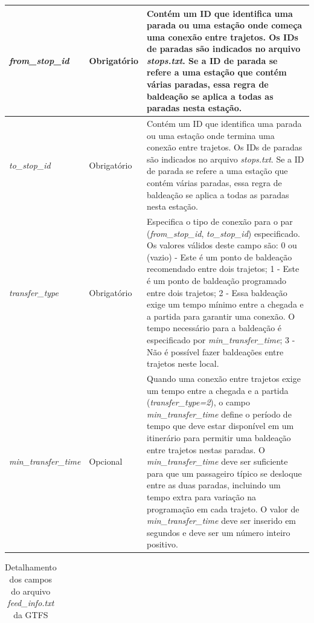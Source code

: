 \documentclass[
	12pt,				%
	oneside,			%
	a4paper,			%
	english,			%
	brazil				%
	]{abntex2ppgsi}
\begin{document}
{{\begin{apendicesenv}
\begin{longtable}[!htb]{>{\centering\arraybackslash}m{3.8cm} | >{\centering}m{2.5cm} | >{\centering\arraybackslash}m{8.5cm}}
\hline 
\textit{from\_stop\_id} & Obrigatório & Contém um ID que identifica uma parada ou uma estação onde começa uma conexão entre trajetos. Os IDs de paradas são indicados no arquivo \textit{stops.txt}. Se a ID de parada se refere a uma estação que contém várias paradas, essa regra de baldeação se aplica a todas as paradas nesta estação. \\
\hline 
\textit{to\_stop\_id} & Obrigatório & Contém um ID que identifica uma parada ou uma estação onde termina uma conexão entre trajetos. Os IDs de paradas são indicados no arquivo \textit{stops.txt}. Se a ID de parada se refere a uma estação que contém várias paradas, essa regra de baldeação se aplica a todas as paradas nesta estação. \\
\hline 
\textit{transfer\_type} & Obrigatório & Especifica o tipo de conexão para o par (\textit{from\_stop\_id}, \textit{to\_stop\_id}) especificado. Os valores válidos deste campo são: 0 ou (vazio) - Este é um ponto de baldeação recomendado entre dois trajetos; 1 - Este é um ponto de baldeação programado entre dois trajetos; 2 - Essa baldeação exige um tempo mínimo entre a chegada e a partida para garantir uma conexão. O tempo necessário para a baldeação é especificado por \textit{min\_transfer\_time}; 3 - Não é possível fazer baldeações entre trajetos neste local. \\
\hline 
\textit{min\_transfer\_time} & Opcional & Quando uma conexão entre trajetos exige um tempo entre a chegada e a partida (\textit{transfer\_type=2}), o campo \textit{min\_transfer\_time} define o período de tempo que deve estar disponível em um itinerário para permitir uma baldeação entre trajetos nestas paradas. O \textit{min\_transfer\_time} deve ser suficiente para que um passageiro típico se desloque entre as duas paradas, incluindo um tempo extra para variação na programação em cada trajeto.
O valor de \textit{min\_transfer\_time} deve ser inserido em segundos e deve ser um número inteiro positivo. \\
\hline 
\end{longtable}
\vspace{-\baselineskip}

\clearpage

\begin{longtable}[!htb]{>{\centering\arraybackslash}m{3.8cm} | >{\centering}m{2.5cm} | >{\centering\arraybackslash}m{8.5cm}}
  \caption{Detalhamento dos campos do arquivo \textit{feed\_info.txt} da GTFS}
      \label{tab:gtfsFeedInfo} \\


\end{longtable}
\end{apendicesenv}}}
\end{document}
